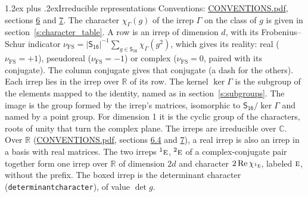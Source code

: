 \documentclass[10pt,a4paper]{article}
\makeatletter
\renewcommand\section{\@startsection{section}{1}{\z@}{-3ex plus -1ex minus -.2ex}%
  {1.2ex plus .2ex}{\normalfont\large\sffamily\bfseries\color{parttitle}}}
\numberwithin{equation}{section}
\newcommand{\grp}[1]{\mathsf{#1}}
\newcommand{\irr}[1]{\text{\normalfont\scshape #1}}
\newcommand{\conjpair}[1]{{}^{#1}}
\newcommand{\irchar}[1]{\chi_{#1}}
\newcommand{\fsind}{\nu_{\mathrm{FS}}}
\makeatother
\begin{document}
\section{Irreducible representations}\label{s:irreps}
Conventions: \href{../../CONVENTIONS.pdf}{CONVENTIONS.pdf}, sections \href{../../CONVENTIONS.pdf\#conv.6}{6} and \href{../../CONVENTIONS.pdf\#conv.7}{7}.
\leavevmode\label{n:function.character}\label{n:irrep.Gamma}The character $\irchar{\Gamma}(g)$ of the irrep $\Gamma$ on the class of $g$ is given in section~\ref{s:character_table}.
\leavevmode\label{n:index.dimension}\label{n:index.frobenius}\label{n:head.irrep}\label{n:head.reality}A row is an irrep of dimension $d$, with its Frobenius--Schur indicator $\fsind = |\grp{S_{16}}|^{-1}\allowbreak\sum_{g\in\grp{S_{16}}}\irchar{\Gamma}(g^2)$, which gives its reality: real ($\fsind = +1$), pseudoreal ($\fsind = -1$) or complex ($\fsind = 0$, paired with its conjugate). \label{n:head.conjugate}The column conjugate gives that conjugate (a dash for the others). \label{n:head.over.real}Each irrep lies in the irrep over $\mathbb{R}$ of its row. \label{n:head.kernel}The kernel $\ker\Gamma$ is the subgroup of the elements mapped to the identity, named as in section~\ref{s:subgroups}. \label{n:head.image}The image is the group formed by the irrep's matrices, isomorphic to $\grp{S_{16}}/\ker\Gamma$ and named by a point group. For dimension 1 it is the cyclic group of the characters, roots of unity that turn the complex plane. The irreps are irreducible over $\mathbb{C}$. Over $\mathbb{R}$ (\href{../../CONVENTIONS.pdf}{CONVENTIONS.pdf}, sections \href{../../CONVENTIONS.pdf\#conv.6.4}{6.4} and \href{../../CONVENTIONS.pdf\#conv.7}{7}), a real irrep is also an irrep in a basis with real matrices. The two irreps $\conjpair{1}\irr{e}$, $\conjpair{2}\irr{e}$ of a complex-conjugate pair together form one irrep over $\mathbb{R}$ of dimension $2d$ and character $2\operatorname{Re}\irchar{\conjpair{1}\irr{e}}$, labeled $\irr{e}$, without the prefix. \label{n:mark.determinant}The boxed irrep is the determinant character (\texttt{determinantcharacter}), of value $\det g$.
\setlength{\emergencystretch}{2em}\par\setlength{\emergencystretch}{0pt}
\end{document}
